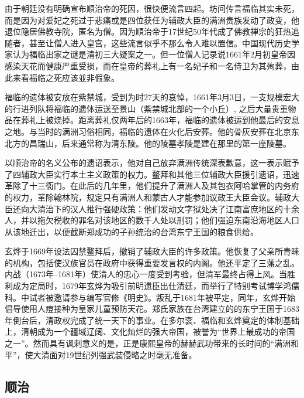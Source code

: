 由于朝廷没有明确宣布順治帝的死因，很快便流言四起。坊间传言福临其实未死，而是因为对爱妃之死过于悲痛或是四位获任为辅政大臣的满洲贵族发动了政变，他退位隐居佛教寺院，匿名为僧。因为順治帝于17世纪50年代成了佛教禅宗的狂热追随者，甚至让僧人进入皇宫，这些流言似乎不那么令人难以置信。中国现代历史学家认为福临出家之谜是清初三大疑案之一。但一位僧人记录说1661年2月初皇帝因感染天花而健康严重受损，而在皇帝的葬礼上有一名妃子和一名侍卫为其殉葬，由此来看福临之死应该並非假象。

福临的遗体被安放在紫禁城，受到为时27天的哀悼，1661年3月3日，一支规模宏大的行进列队将福临的遗体运送至景山（紫禁城北部的一个小丘）, 之后大量贵重物品在葬礼上被烧掉。距离葬礼仅两年后的1663年，福临的遗体被运到他最后的安息之地。与当时的满洲习俗相同，福临的遗体在火化后安葬。他的骨灰安葬在北京东北方的昌瑞山，后来通常称为清东陵。他的陵墓孝陵是建在那里的第一座陵墓。

以順治帝的名义公布的遗诏表示，他对自己放弃满洲传统深表歉意，这一表示赋予了四辅政大臣实行本土主义政策的权力。鳌拜和其他三位辅政大臣援引遗诏，迅速革除了十三衙门。在此后的几年里，他们提升了满洲人及其包衣阿哈掌管的内务府的权力，革除翰林院，规定只有满洲人和蒙古人才能参加议政王大臣会议。辅政大臣还向大清治下的汉人推行强硬政策：他们发动文字狱处决了江南富庶地区的十余人，并以拖欠税收的罪名对该地区的数千人处以刑罚；他们强迫东南沿海地区人口从该地迁出，以便截断郑成功的子孙统治的台湾东宁王国的粮食供给。

玄烨于1669年设法囚禁鳌拜后，撤销了辅政大臣的许多政策。他恢复了父亲所青睐的机构，包括使汉族官员在政府中获得重要发言权的内阁。他还平定了三藩之乱。内战（1673年–1681年）使清人的忠心一度受到考验，但清军最终占得上风。当胜利成为定局时，1679年玄烨为吸引前明遗臣出仕清廷，而举行了特别考试博学鸿儒科。中试者被邀请参与编写官修《明史》。叛乱于1681年被平定，同年，玄烨开始倡导使用人痘接种为皇家儿童预防天花。郑氏家族在台湾建立的的东宁王国于1683年倒台后，清政权完成了统一天下的事业。在多尔衮、福临和玄烨奠定的体制基础上，清朝成为一个疆域辽阔、文化灿烂的强大帝国，被誉为“世界上最成功的帝国之一”。然而具有讽刺意义的是，正是康熙皇帝的赫赫武功带来的长时间的“满洲和平”，使大清面对19世纪列强武装侵略之时毫无准备。

\subsection{顺治}

